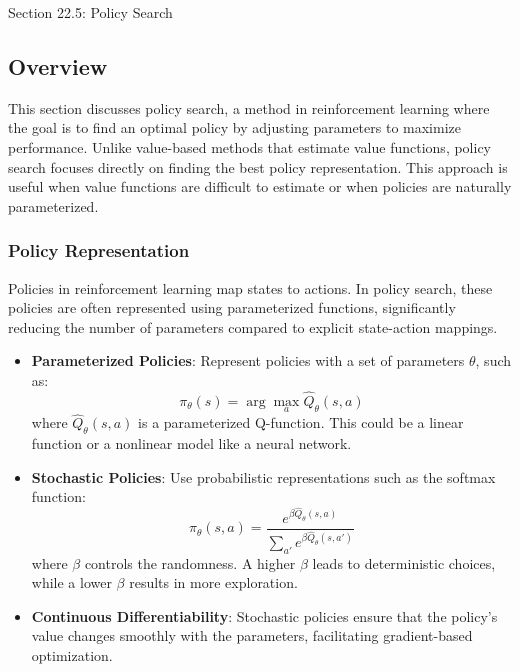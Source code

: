 \begin{notes}{Section 22.5: Policy Search}
    \subsection*{Overview}

    This section discusses policy search, a method in reinforcement learning where the goal is to find an optimal policy by adjusting parameters to maximize performance. Unlike value-based methods that 
    estimate value functions, policy search focuses directly on finding the best policy representation. This approach is useful when value functions are difficult to estimate or when policies are naturally 
    parameterized.
    
    \subsubsection*{Policy Representation}
    
    Policies in reinforcement learning map states to actions. In policy search, these policies are often represented using parameterized functions, significantly reducing the number of parameters compared to 
    explicit state-action mappings.
    
    \begin{highlight}
    
        \begin{itemize}
            \item \textbf{Parameterized Policies}: Represent policies with a set of parameters $\theta$, such as:
            \[
            \pi_\theta(s) = \arg\max_a \hat{Q}_\theta(s, a)
            \]
            where $\hat{Q}_\theta(s, a)$ is a parameterized Q-function. This could be a linear function or a nonlinear model like a neural network.
            \item \textbf{Stochastic Policies}: Use probabilistic representations such as the softmax function:
            \[
            \pi_\theta(s, a) = \frac{e^{\beta \hat{Q}_\theta(s, a)}}{\sum_{a'} e^{\beta \hat{Q}_\theta(s, a')}}
            \]
            where $\beta$ controls the randomness. A higher $\beta$ leads to deterministic choices, while a lower $\beta$ results in more exploration.
            \item \textbf{Continuous Differentiability}: Stochastic policies ensure that the policy's value changes smoothly with the parameters, facilitating gradient-based optimization.
        \end{itemize}
    

\end{highlight}
\end{notes}
